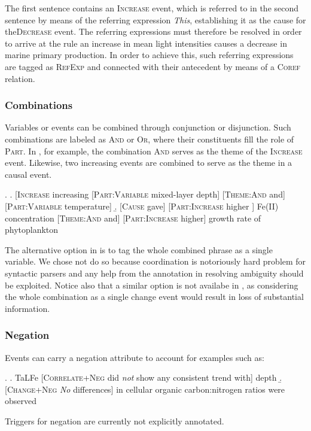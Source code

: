 \documentclass[10pt, a4paper]{article}
\newcommand{\tag}[1]{\textsc{#1}}
\begin{document}
The first sentence contains an \tag{Increase} event, which is referred to in the second sentence by means of the referring expression \emph{This}, establishing it as the cause for the\tag{Decrease} event.
The referring expressions must therefore be resolved in order to arrive at the rule an increase in mean light intensities causes a decrease in marine primary production.
In order to achieve this, such referring expressions are tagged as \tag{RefExp} and connected with their antecedent by means of a \tag{Coref} relation. 
  

\subsubsection{Combinations}

Variables or events can be combined through conjunction or disjunction.
Such combinations are labeled as \tag{And} or \tag{Or}, where their constituents fill the role of \tag{Part}.
In \Next[a], for example, the combination \tag{And} serves as the theme of the \tag{Increase} event.
Likewise, two increasing events are combined to serve as the theme in a causal event.

\exi.
  \a. [\tag{Increase} increasing [\tag{Part:Variable} mixed-layer depth] [\tag{Theme:And} and] [\tag{Part:Variable} temperature]  
  \b. [\tag{Cause} gave] [\tag{Part:Increase} higher ] Fe(II) concentration [\tag{Theme:And} and] [\tag{Part:Increase} higher] growth rate of phytoplankton

The alternative option in \Last[a] is to tag the whole combined phrase as a single variable.
We chose not do so because coordination is notoriously hard problem for syntactic parsers and any help from the annotation in resolving ambiguity should be exploited.
Notice also that a similar option is not availabe in \Last[b], as considering the whole combination as a single change event would result in loss of substantial information.


\subsubsection{Negation}

Events can carry a negation attribute to account for examples such as:

\exi.
  \a. TaLFe [\tag{Correlate+Neg} did \emph{not} show any consistent trend with] depth 
  \b. [\tag{Change+Neg} \emph{No} differences] in cellular organic carbon:nitrogen ratios were observed

Triggers for negation are currently not explicitly annotated.
\end{document}
